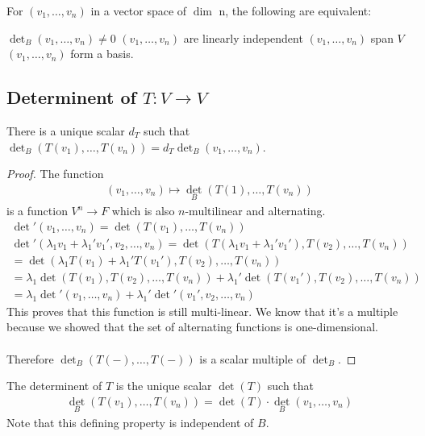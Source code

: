\documentclass[class=scrartcl, crop=false]{standalone}
\begin{document}
\begin{proposition}
  For $(v_1, \dots, v_n)$ in a vector space of $\dim$ n, the following are equivalent:
  \begin{enumerate}
    \ii
    $\det_B(v_1, \dots, v_n) \neq 0$ 
    \ii
    $(v_1, \dots, v_n)$ are linearly independent
    \ii
    $(v_1, \dots, v_n)$ span $V$ 
    \ii
    $(v_1, \dots, v_n)$ form a basis.
  \end{enumerate} 
\end{proposition} 

\subsection{Determinent of $T: V \to V$}

\begin{proposition}
  There is a unique scalar $d_T$ such that $\det_B(T(v_1), \dots, T(v_n)) = d_T\det_B(v_1, \dots, v_n)$.
  \begin{proof}
    The function
    \begin{gather*}
      (v_1, \dots, v_n) \mapsto \det_B(T(1), \dots, T(v_n))
    \end{gather*} 
    is a function $V^n \to F$ which is also $n$-multilinear and alternating.
    \begin{gather*}
      \det'(v_1, \dots, v_n) = \det(T(v_1), \dots, T(v_n)) \\
      \det'(\lambda_1v_1 + \lambda_1'v_1', v_2, \dots, v_n) 
      = \det(T(\lambda_1v_1 + \lambda_1'v_1'), T(v_2), \dots, T(v_n)) \\
      = \det(\lambda_1T(v_1) + \lambda_1'T(v_1'), T(v_2), \dots, T(v_n)) \\
      = \lambda_1\det(T(v_1), T(v_2), \dots, T(v_n)) + \lambda_1'\det(T(v_1'), T(v_2), \dots, T(v_n)) \\
      = \lambda_1\det'(v_1, \dots, v_n) + \lambda_1'\det'(v_1', v_2, \dots, v_n)
    \end{gather*} 
    This proves that this function is still multi-linear. We know that it's a multiple because we showed that the set of alternating functions is one-dimensional. %
    \\\\
    Therefore $\det_B(T(-), \dots, T(-))$ is a scalar multiple of $\det_B$.
  \end{proof} 
\end{proposition} 

\begin{definition}
  The determinent of $T$ is the unique scalar $\det(T)$ such that 
  \begin{gather*}
    \det_B(T(v_1), \dots, T(v_n)) = \det(T) \cdot \det_B(v_1, \dots, v_n)
  \end{gather*} 
  Note that this defining property is independent of $B$.
\end{definition} 
\end{document}
